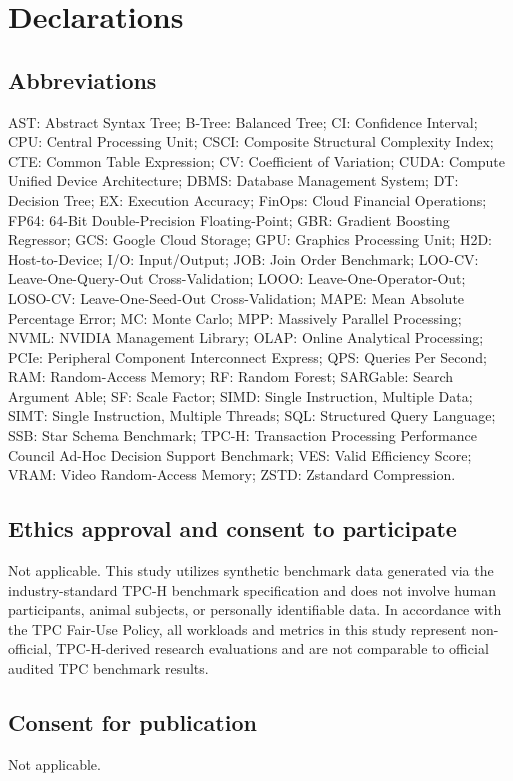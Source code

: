 \documentclass[10pt,a4paper]{article}
\begin{document}
\section*{Declarations}

\subsection*{Abbreviations}
AST: Abstract Syntax Tree; B-Tree: Balanced Tree; CI: Confidence Interval; CPU: Central Processing Unit; CSCI: Composite Structural Complexity Index; CTE: Common Table Expression; CV: Coefficient of Variation; CUDA: Compute Unified Device Architecture; DBMS: Database Management System; DT: Decision Tree; EX: Execution Accuracy; FinOps: Cloud Financial Operations; FP64: 64-Bit Double-Precision Floating-Point; GBR: Gradient Boosting Regressor; GCS: Google Cloud Storage; GPU: Graphics Processing Unit; H2D: Host-to-Device; I/O: Input/Output; JOB: Join Order Benchmark; LOO-CV: Leave-One-Query-Out Cross-Validation; LOOO: Leave-One-Operator-Out; LOSO-CV: Leave-One-Seed-Out Cross-Validation; MAPE: Mean Absolute Percentage Error; MC: Monte Carlo; MPP: Massively Parallel Processing; NVML: NVIDIA Management Library; OLAP: Online Analytical Processing; PCIe: Peripheral Component Interconnect Express; QPS: Queries Per Second; RAM: Random-Access Memory; RF: Random Forest; SARGable: Search Argument Able; SF: Scale Factor; SIMD: Single Instruction, Multiple Data; SIMT: Single Instruction, Multiple Threads; SQL: Structured Query Language; SSB: Star Schema Benchmark; TPC-H: Transaction Processing Performance Council Ad-Hoc Decision Support Benchmark; VES: Valid Efficiency Score; VRAM: Video Random-Access Memory; ZSTD: Zstandard Compression.

\subsection*{Ethics approval and consent to participate}
Not applicable. This study utilizes synthetic benchmark data generated via the industry-standard TPC-H benchmark specification \cite{tpc2022tpch} and does not involve human participants, animal subjects, or personally identifiable data. In accordance with the TPC Fair-Use Policy, all workloads and metrics in this study represent non-official, TPC-H-derived research evaluations and are not comparable to official audited TPC benchmark results.

\subsection*{Consent for publication}
Not applicable.
\end{document}
